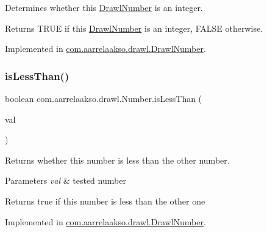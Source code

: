 Determines whether this \hyperlink{classcom_1_1aarrelaakso_1_1drawl_1_1_drawl_number}{Drawl\+Number} is an integer. 

\begin{DoxyReturn}{Returns}
{\ttfamily T\+R\+UE} if this \hyperlink{classcom_1_1aarrelaakso_1_1drawl_1_1_drawl_number}{Drawl\+Number} is an integer, {\ttfamily F\+A\+L\+SE} otherwise. 
\end{DoxyReturn}


Implemented in \hyperlink{classcom_1_1aarrelaakso_1_1drawl_1_1_drawl_number_a520419e41b314adf719cfcd5939dee01}{com.\+aarrelaakso.\+drawl.\+Drawl\+Number}.

\mbox{\label{interfacecom_1_1aarrelaakso_1_1drawl_1_1_number_acc7fec3a209cb27e09a45f17ed9fd4e1}} 
\subsubsection{\texorpdfstring{is\+Less\+Than()}{isLessThan()}\hspace{0.1cm}{\footnotesize\ttfamily [1/2]}}
{\footnotesize\ttfamily boolean com.\+aarrelaakso.\+drawl.\+Number.\+is\+Less\+Than (\begin{DoxyParamCaption}\item[{@Not\+Null final \hyperlink{interfacecom_1_1aarrelaakso_1_1drawl_1_1_number}{Number}}]{val }\end{DoxyParamCaption})}



Returns whether this number is less than the other number. 


\begin{DoxyParams}{Parameters}
{\em val} & tested number \\
\hline
\end{DoxyParams}
\begin{DoxyReturn}{Returns}
true if this number is less than the other one 
\end{DoxyReturn}


Implemented in \hyperlink{classcom_1_1aarrelaakso_1_1drawl_1_1_drawl_number_a6b5501320af37fd5aa623ed4bcbbd104}{com.\+aarrelaakso.\+drawl.\+Drawl\+Number}.

\mbox{\label{interfacecom_1_1aarrelaakso_1_1drawl_1_1_number_a82b299428c48204fb05229dbea2b439b}} 
